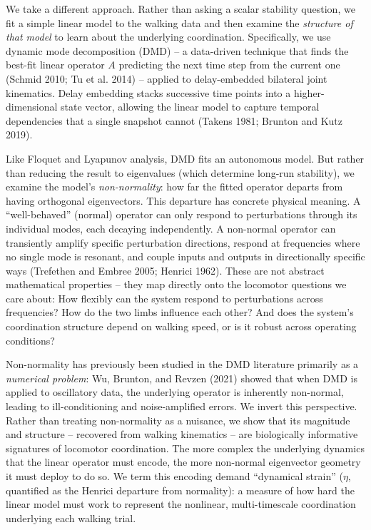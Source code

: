 \documentclass[
  letterpaper,
  DIV=11,
  numbers=noendperiod]{scrartcl}
\begin{document}
We take a different approach. Rather than asking a scalar stability
question, we fit a simple linear model to the walking data and then
examine the \emph{structure of that model} to learn about the underlying
coordination. Specifically, we use dynamic mode decomposition (DMD) -- a
data-driven technique that finds the best-fit linear operator \(A\)
predicting the next time step from the current one (Schmid 2010; Tu et
al. 2014) -- applied to delay-embedded bilateral joint kinematics. Delay
embedding stacks successive time points into a higher-dimensional state
vector, allowing the linear model to capture temporal dependencies that
a single snapshot cannot (Takens 1981; Brunton and Kutz 2019).

Like Floquet and Lyapunov analysis, DMD fits an autonomous model. But
rather than reducing the result to eigenvalues (which determine long-run
stability), we examine the model's \emph{non-normality}: how far the
fitted operator departs from having orthogonal eigenvectors. This
departure has concrete physical meaning. A ``well-behaved'' (normal)
operator can only respond to perturbations through its individual modes,
each decaying independently. A non-normal operator can transiently
amplify specific perturbation directions, respond at frequencies where
no single mode is resonant, and couple inputs and outputs in
directionally specific ways (Trefethen and Embree 2005; Henrici 1962).
These are not abstract mathematical properties -- they map directly onto
the locomotor questions we care about: How flexibly can the system
respond to perturbations across frequencies? How do the two limbs
influence each other? And does the system's coordination structure
depend on walking speed, or is it robust across operating conditions?

Non-normality has previously been studied in the DMD literature
primarily as a \emph{numerical problem}: Wu, Brunton, and Revzen (2021)
showed that when DMD is applied to oscillatory data, the underlying
operator is inherently non-normal, leading to ill-conditioning and
noise-amplified errors. We invert this perspective. Rather than treating
non-normality as a nuisance, we show that its magnitude and structure --
recovered from walking kinematics -- are biologically informative
signatures of locomotor coordination. The more complex the underlying
dynamics that the linear operator must encode, the more non-normal
eigenvector geometry it must deploy to do so. We term this encoding
demand ``dynamical strain'' (\(\eta\), quantified as the Henrici
departure from normality): a measure of how hard the linear model must
work to represent the nonlinear, multi-timescale coordination underlying
each walking trial.
\end{document}
